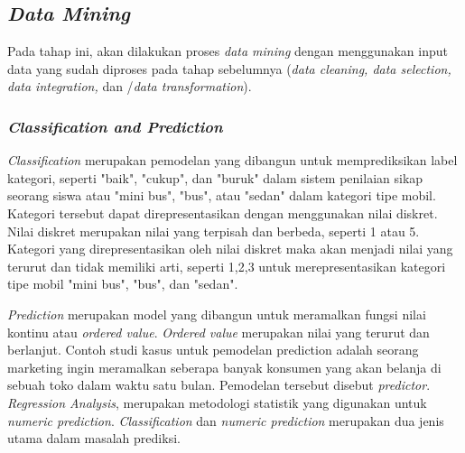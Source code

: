 

\subsection{\textsl{Data Mining}}

Pada tahap ini, akan dilakukan proses \textsl{data mining} dengan menggunakan input data yang sudah diproses pada tahap sebelumnya (\textsl{data cleaning, data selection, data integration,} dan /\textsl{data transformation}).

\subsubsection{\textsl{Classification and Prediction}}
\textsl{Classification} merupakan pemodelan yang dibangun untuk memprediksikan label kategori, seperti "baik", "cukup", dan "buruk" dalam sistem penilaian sikap seorang siswa atau "mini bus", "bus", atau "sedan" dalam kategori tipe mobil. Kategori tersebut dapat direpresentasikan dengan menggunakan nilai diskret. Nilai diskret merupakan nilai yang terpisah dan berbeda, seperti 1 atau 5. Kategori yang direpresentasikan oleh nilai diskret maka akan menjadi nilai yang terurut dan tidak memiliki arti, seperti 1,2,3 untuk merepresentasikan kategori tipe mobil "mini bus", "bus", dan "sedan".

\textsl{Prediction} merupakan model yang dibangun untuk meramalkan fungsi nilai kontinu atau \textsl{ordered value}. \textsl{Ordered value} merupakan nilai yang terurut dan berlanjut. Contoh studi kasus untuk pemodelan prediction adalah seorang marketing ingin meramalkan seberapa banyak konsumen yang akan belanja di sebuah toko dalam waktu satu bulan. Pemodelan tersebut disebut \textsl{predictor}. \textsl{Regression Analysis}, merupakan metodologi statistik yang digunakan untuk \textsl{numeric prediction}. \textsl{Classification} dan \textsl{numeric prediction} merupakan dua jenis utama dalam masalah prediksi.

